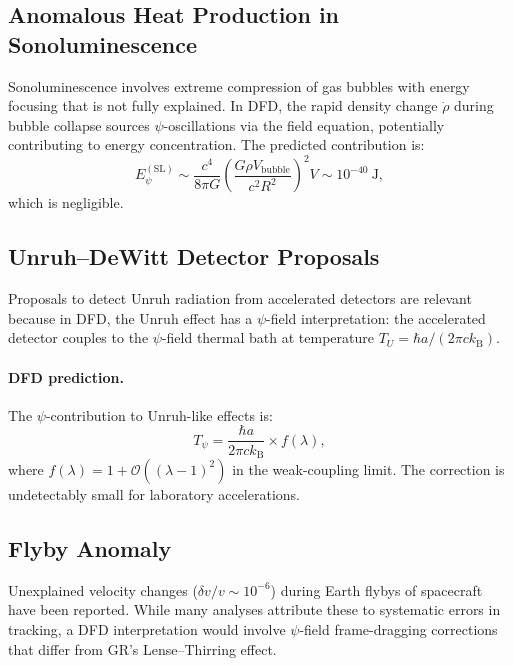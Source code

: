 \documentclass[aps,prd,twocolumn,showpacs,preprintnumbers,superscriptaddress,nofootinbib]{revtex4-2}
\newcommand{\order}[1]{\mathcal{O}\!\left(#1\right)}
\newcommand{\kB}{k_{\mathrm{B}}}
\begin{document}
\subsection{Anomalous Heat Production in Sonoluminescence~\cite{Putterman1995}}\label{sec:sonolum}

Sonoluminescence involves extreme compression of gas bubbles with
energy focusing that is not fully explained.  In DFD, the rapid
density change $\dot\rho$ during bubble collapse sources
$\psi$-oscillations via the field equation, potentially contributing
to energy concentration.  The predicted contribution is:
\begin{equation}
E_\psi^{(\mathrm{SL})} \sim \frac{c^4}{8\pi G}\left(\frac{G\rho V_{\mathrm{bubble}}}{c^2 R^2}\right)^2 V
  \sim 10^{-40}~\mathrm{J},
\end{equation}
which is negligible.

\subsection{Unruh--DeWitt Detector Proposals~\cite{Scully2003}}\label{sec:unruh}

Proposals to detect Unruh radiation from accelerated detectors are
relevant because in DFD, the Unruh effect has a $\psi$-field
interpretation: the accelerated detector couples to the $\psi$-field
thermal bath at temperature $T_U = \hbar a/(2\pi c\kB)$.

\paragraph{DFD prediction.}
The $\psi$-contribution to Unruh-like effects is:
\begin{equation}
T_\psi = \frac{\hbar a}{2\pi c\kB}\times f(\lambda),
\end{equation}
where $f(\lambda) = 1 + \order{(\lambda-1)^2}$ in the weak-coupling
limit.  The correction is undetectably small for laboratory
accelerations.

\subsection{Flyby Anomaly~\cite{Anderson2008}}\label{sec:flyby}

Unexplained velocity changes ($\delta v/v \sim 10^{-6}$) during
Earth flybys of spacecraft have been reported.  While many analyses
attribute these to systematic errors in tracking, a DFD interpretation
would involve $\psi$-field frame-dragging corrections that differ from
GR's Lense--Thirring effect.
\end{document}
